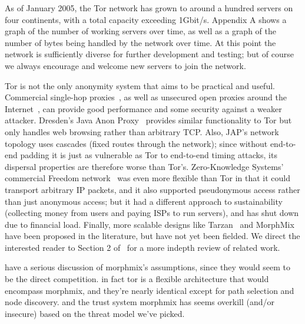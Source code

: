 \documentclass{llncs}
\begin{document}
As of January 2005, the Tor network has grown to around a hundred servers
on four continents, with a total capacity exceeding 1Gbit/s. Appendix A
shows a graph of the number of working servers over time, as well as a
graph of the number of bytes being handled by the network over time. At
this point the network is sufficiently diverse for further development
and testing; but of course we always encourage and welcome new servers
to join the network.


Tor is not the only anonymity system that aims to be practical and useful.
Commercial single-hop proxies~\cite{anonymizer}, as well as unsecured
open proxies around the Internet~\cite{open-proxies}, can provide good
performance and some security against a weaker attacker. Dresden's Java
Anon Proxy~\cite{web-mix} provides similar functionality to Tor but only
handles web browsing rather than arbitrary TCP. Also, JAP's network
topology uses cascades (fixed routes through the network); since without
end-to-end padding it is just as vulnerable as Tor to end-to-end timing
attacks, its dispersal properties are therefore worse than Tor's.
Zero-Knowledge Systems' commercial Freedom
network~\cite{freedom21-security} was even more flexible than Tor in
that it could transport arbitrary IP packets, and it also supported
pseudonymous access rather than just anonymous access; but it had
a different approach to sustainability (collecting money from users
and paying ISPs to run servers), and has shut down due to financial
load.  Finally, more scalable designs like Tarzan~\cite{tarzan:ccs02} and
MorphMix~\cite{morphmix:fc04} have been proposed in the literature, but
have not yet been fielded. We direct the interested reader to Section
2 of~\cite{tor-design} for a more indepth review of related work.



have a serious discussion of morphmix's assumptions, since they would
seem to be the direct competition. in fact tor is a flexible architecture
that would encompass morphmix, and they're nearly identical except for
path selection and node discovery. and the trust system morphmix has
seems overkill (and/or insecure) based on the threat model we've picked.
\end{document}
